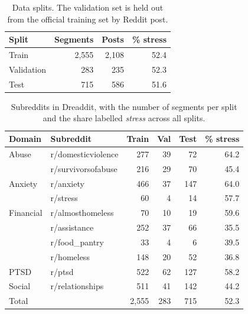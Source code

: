 \begin{table}
  \caption{Data splits. The validation set is held out from the official training set by Reddit post.}
  \label{tab:splits}
  \begin{minipage}{\textwidth}
  \begin{tabular}{lrrr}
  \hline\hline
  Split & Segments & Posts & \% stress\\
  \hline
  Train      & 2,555 & 2,108 & 52.4\\
  Validation &   283 &   235 & 52.3\\
  Test       &   715 &   586 & 51.6\\
  \hline\hline
  \end{tabular}
  \end{minipage}
\end{table}

\begin{table}
  \caption{Subreddits in Dreaddit, with the number of segments per split and the share labelled
  \emph{stress} across all splits.}
  \label{tab:subreddits}
  \begin{minipage}{\textwidth}
  \begin{tabular}{llrrrr}
  \hline\hline
  Domain & Subreddit & Train & Val & Test & \% stress\\
  \hline
  Abuse     & r/domesticviolence & 277 & 39 &  72 & 64.2\\
            & r/survivorsofabuse & 216 & 29 &  70 & 45.4\\
  Anxiety   & r/anxiety          & 466 & 37 & 147 & 64.0\\
            & r/stress           &  60 &  4 &  14 & 57.7\\
  Financial & r/almosthomeless   &  70 & 10 &  19 & 59.6\\
            & r/assistance       & 252 & 37 &  66 & 35.5\\
            & r/food\_pantry     &  33 &  4 &   6 & 39.5\\
            & r/homeless         & 148 & 20 &  52 & 36.8\\
  PTSD      & r/ptsd             & 522 & 62 & 127 & 58.2\\
  Social    & r/relationships    & 511 & 41 & 142 & 44.2\\
  \hline
  Total     &                    & 2,555 & 283 & 715 & 52.3\\
  \hline\hline
  \end{tabular}
  \end{minipage}
\end{table}

